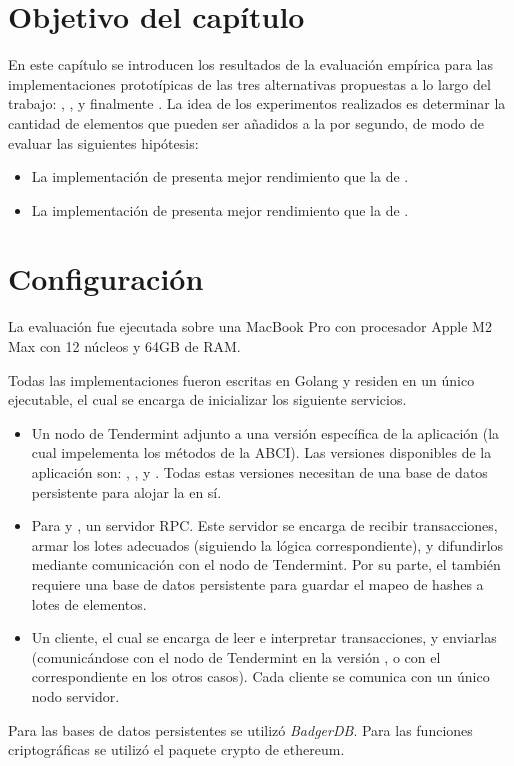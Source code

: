 \section{Objetivo del capítulo}\label{sec:benchmark}
En este capítulo se introducen los resultados de la evaluación empírica para las implementaciones
prototípicas de las tres alternativas propuestas a lo largo del trabajo: \vanilla, \compresschain,
y finalmente \hashchain.
La idea de los experimentos realizados es determinar la cantidad de elementos que pueden ser
añadidos a la \setchain por segundo, de modo de evaluar las siguientes hipótesis:
\begin{itemize}
	\item La implementación de \compresschain presenta mejor rendimiento que la de \vanilla.
	\item La implementación de \hashchain presenta mejor rendimiento que la de \compresschain.
\end{itemize}

\section{Configuración}
%
La evaluación fue ejecutada sobre una MacBook Pro con procesador Apple M2 Max
con 12 núcleos y 64GB de RAM.

%
Todas las implementaciones fueron escritas en Golang y residen en un único ejecutable, el cual se encarga
de inicializar los siguiente servicios.
\begin{itemize}
	\item Un nodo de Tendermint adjunto a una versión específica de la aplicación (la cual impelementa los métodos
	de la ABCI). Las versiones disponibles de la aplicación son: \vanilla, \compresschain, y \hashchain. Todas estas
	versiones necesitan de una base de datos persistente para alojar la \setchain en sí.
	\item Para \compresschain y \hashchain, un servidor \collector RPC. Este servidor se encarga de recibir transacciones,
	armar los lotes adecuados (siguiendo la lógica correspondiente), y difundirlos mediante comunicación con el nodo
	de Tendermint. Por su parte, el \hcollector también requiere una base de datos persistente para guardar el mapeo de
	hashes a lotes de elementos.
	\item Un cliente, el cual se encarga de leer e interpretar transacciones, y enviarlas (comunicándose con el nodo de
	Tendermint en la versión \vanilla, o con el \collector correspondiente en los otros casos). Cada cliente se comunica
	con un único nodo servidor.
\end{itemize}
Para las bases de datos persistentes se utilizó \textit{BadgerDB}\cite{db.badger}.
Para las funciones criptográficas se utilizó el paquete crypto de ethereum. 

